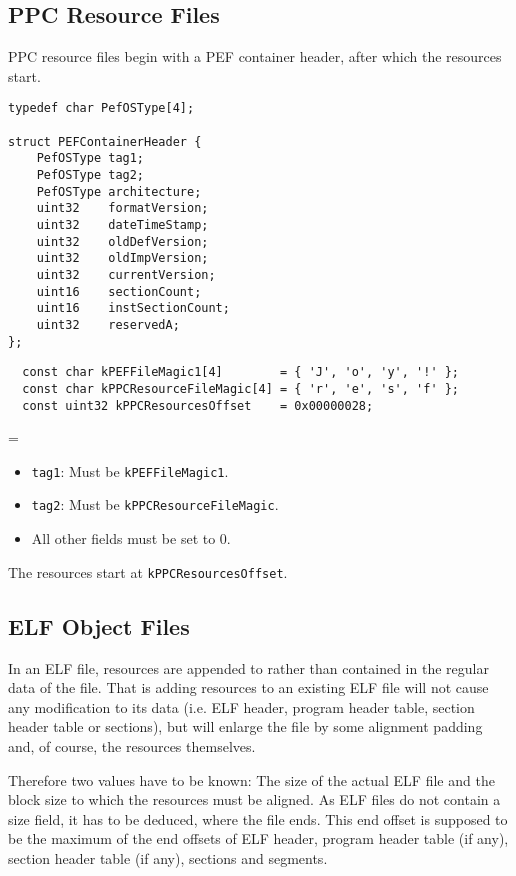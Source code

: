 \documentclass[12pt, a4paper]{article}
\newcommand{\code}[1]{{\tt #1}}
\newenvironment{nitemize}{
  \newdimen\oldparindent
  \oldparindent=\parindent
  \begin{itemize}
  \itemindent=-\oldparindent
}{
  \end{itemize}
}
\newcommand{\codeblockbegin}{\begin{flushleft}\begin{minipage}{\textwidth}}
\newcommand{\codeblockend}{\end{minipage}\end{flushleft}}
\begin{document}
\subsection{PPC Resource Files}

PPC resource files begin with a PEF container header, after which the
resources start.
%
\codeblockbegin
\begin{verbatim}
typedef char PefOSType[4];

struct PEFContainerHeader {
    PefOSType tag1;
    PefOSType tag2;
    PefOSType architecture;
    uint32    formatVersion;
    uint32    dateTimeStamp;
    uint32    oldDefVersion;
    uint32    oldImpVersion;
    uint32    currentVersion;
    uint16    sectionCount;
    uint16    instSectionCount;
    uint32    reservedA;
};
\end{verbatim}
\codeblockend
%
\codeblockbegin
\begin{verbatim}
  const char kPEFFileMagic1[4]        = { 'J', 'o', 'y', '!' };
  const char kPPCResourceFileMagic[4] = { 'r', 'e', 's', 'f' };
  const uint32 kPPCResourcesOffset    = 0x00000028;
\end{verbatim}
\codeblockend

\begin{nitemize}
\item{\code{tag1}:
  Must be \code{kPEFFileMagic1}.}
\item{\code{tag2}:
  Must be \code{kPPCResourceFileMagic}.}
\item{All other fields must be set to 0.}
\end{nitemize}

\noindent
The resources start at \code{kPPCResourcesOffset}.


\subsection{ELF Object Files}

In an ELF file, resources are appended to rather than contained in the
regular data of the file. That is adding resources to an existing ELF file
will not cause any modification to its data (i.e. ELF header, program header
table, section header table or sections), but will enlarge the file by some
alignment padding and, of course, the resources themselves.

Therefore two values have to be known: The size of the actual ELF file and the
block size to which the resources must be aligned. As ELF files do not contain
a size field, it has to be deduced, where the file ends. This end offset is
supposed to be the maximum of the end offsets of ELF header, program header
table (if any), section header table (if any), sections and segments.
\end{document}

